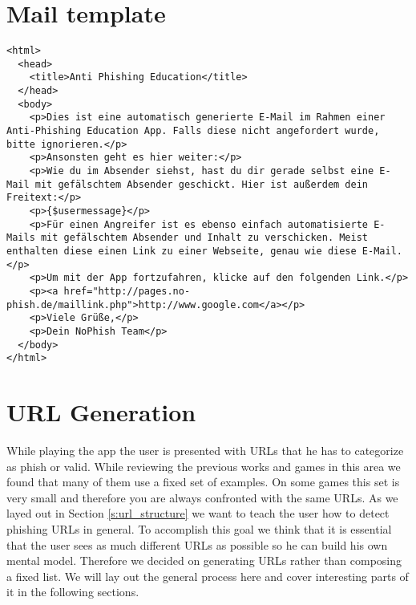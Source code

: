\section{Mail template}
\label{a:mail}
\lstset{language=HTML}
\begin{lstlisting}
<html>
  <head>
    <title>Anti Phishing Education</title>
  </head>
  <body>
    <p>Dies ist eine automatisch generierte E-Mail im Rahmen einer Anti-Phishing Education App. Falls diese nicht angefordert wurde, bitte ignorieren.</p>
    <p>Ansonsten geht es hier weiter:</p>
    <p>Wie du im Absender siehst, hast du dir gerade selbst eine E-Mail mit gefälschtem Absender geschickt. Hier ist außerdem dein Freitext:</p>
    <p>{$usermessage}</p>
    <p>Für einen Angreifer ist es ebenso einfach automatisierte E-Mails mit gefälschtem Absender und Inhalt zu verschicken. Meist enthalten diese einen Link zu einer Webseite, genau wie diese E-Mail.</p>
    <p>Um mit der App fortzufahren, klicke auf den folgenden Link.</p>
    <p><a href="http://pages.no-phish.de/maillink.php">http://www.google.com</a></p>
    <p>Viele Grüße,</p>
    <p>Dein NoPhish Team</p>
  </body>
</html>
\end{lstlisting}

\section{URL Generation}
\label{s:url_generation}
While playing the app the user is presented with URLs that he has to categorize as phish or valid.
While reviewing the previous works and games in this area we found that many of them use a fixed set of examples.
On some games this set is very small and therefore you are always confronted with the same URLs.
As we layed out in Section \autoref{s:url_structure} we want to teach the user how to detect phishing URLs in general.
To accomplish this goal we think that it is essential that the user sees as much different URLs as possible so he can build his own mental model.
Therefore we decided on generating URLs rather than composing a fixed list.
We will lay out the general process here and cover interesting parts of it in the following sections.
